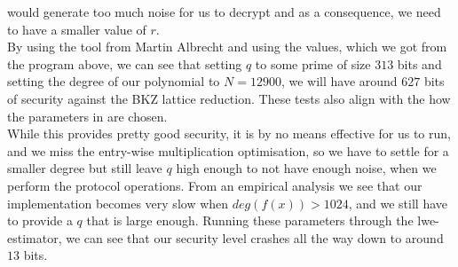 \documentclass[../main.tex]{subfiles}
\begin{document}
	would generate too much noise for us to decrypt and as a consequence, we need to have a smaller value of $r$.
	\\[5mm]
    By using the tool from Martin Albrecht %
    and using the values, which we got from the program above, we can see that setting $q$ to some prime
    of size $313$ bits and setting the degree of our polynomial to $N = 12900$, we will have around $627$ bits
    of security against the BKZ lattice reduction.
    These tests also align with the how the parameters in \cite{damgaard2012multiparty} are chosen.
    \\[5mm]
    While this provides pretty good security, it is by no means effective for us to run, and we miss the entry-wise multiplication optimisation, %
    so we have to settle for a smaller degree but still leave $q$ high enough to not have enough noise, when 
    we perform the protocol operations.
    From an empirical analysis we see that our implementation becomes very slow when $deg(f(x)) > 1024$, and we still have to provide a $q$ that is large enough.
    Running these parameters through the lwe-estimator, we can see that our security level crashes all the way
    down to around $13$ bits. %
\end{document}
